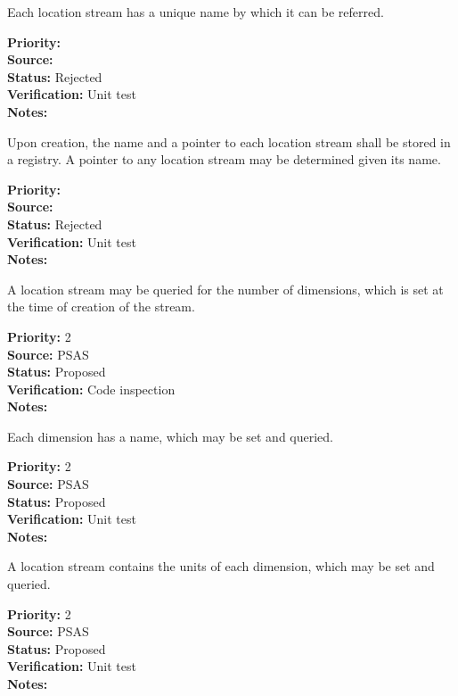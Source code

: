 Each location stream has a unique name by which it can be referred.
\begin{reqlist}
{\bf Priority:} \\
{\bf Source:} \\
{\bf Status:} Rejected \\
{\bf Verification:} Unit test \\
{\bf Notes:} 
\end{reqlist}

Upon creation, the name and a pointer to each location stream shall be stored in a
registry.  A pointer to any location stream may be determined given its name.
\begin{reqlist}
{\bf Priority:}  \\
{\bf Source:} \\
{\bf Status:} Rejected \\
{\bf Verification:} Unit test \\
{\bf Notes:} 
\end{reqlist}

A location stream may be queried for the number of dimensions, which is
set at the time of creation of the stream.
\begin{reqlist}
{\bf Priority:} 2 \\
{\bf Source:} PSAS\\
{\bf Status:} Proposed \\
{\bf Verification:} Code inspection \\
{\bf Notes:} 
\end{reqlist}

Each dimension has a name, which may be set and queried.
\begin{reqlist}
{\bf Priority:} 2 \\
{\bf Source:} PSAS\\
{\bf Status:} Proposed \\
{\bf Verification:} Unit test \\
{\bf Notes:} 
\end{reqlist}

A location stream contains the units of each dimension, which may be set and queried.
\begin{reqlist}
{\bf Priority:} 2 \\
{\bf Source:} PSAS\\
{\bf Status:} Proposed \\
{\bf Verification:} Unit test \\
{\bf Notes:} 
\end{reqlist}

